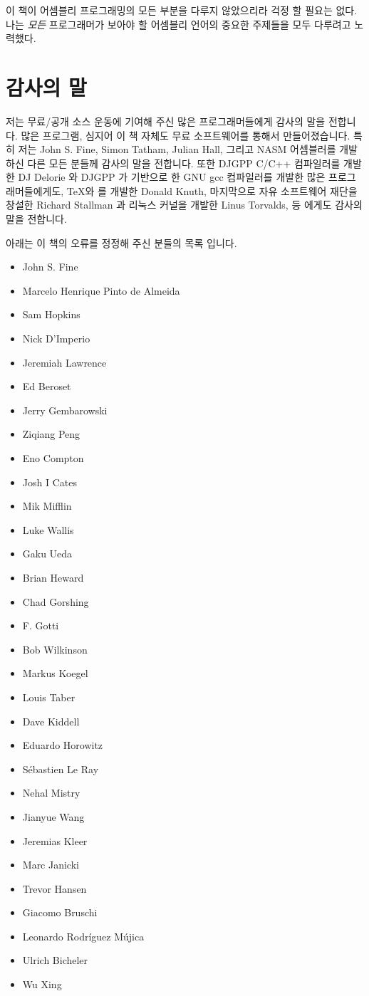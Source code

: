 이 책이 어셈블리 프로그래밍의 모든 부분을 다루지 않았으리라 걱정 할
필요는 없다. 나는 \emph{모든} 프로그래머가 보아야 할 어셈블리 언어의
중요한 주제들을 모두 다루려고 노력했다. 


\section*{감사의 말}

저는 무료/공개 소스 운동에 기여해 주신 많은 프로그래머들에게 감사의 말을 전합니다. 
많은 프로그램, 심지어 이 책 자체도 무료 소프트웨어를 통해서 만들어졌습니다. 특히 저는 
John S. Fine, Simon Tatham, Julian Hall, 그리고 NASM 어셈블러를 개발하신 다른 모든 분들께 
감사의 말을 전합니다. 또한 DJGPP C/C++ 컴파일러를 개발한 DJ Delorie 와 DJGPP 가 기반으로 
한 GNU gcc 컴파일러를 개발한 많은 프로그래머들에게도, \TeX 와 \LaTeXe 를 개발한 Donald Knuth,
마지막으로 자유 소프트웨어 재단을 창설한 Richard Stallman 과 리눅스 커널을 개발한 Linus Torvalds, 
등 에게도 감사의 말을 전합니다. 

아래는 이 책의 오류를 정정해 주신 분들의 목록 입니다. 
\begin{itemize}\setlength{\parskip}{-0.5em}
\item John S. Fine
\item Marcelo Henrique Pinto de Almeida
\item Sam Hopkins
\item Nick D'Imperio
\item Jeremiah Lawrence
\item Ed Beroset
\item Jerry Gembarowski
\item Ziqiang Peng
\item Eno Compton
\item Josh I Cates
\item Mik Mifflin
\item Luke Wallis
\item Gaku Ueda
\item Brian Heward
\item Chad Gorshing
\item F. Gotti
\item Bob Wilkinson
\item Markus Koegel
\item Louis Taber
\item Dave Kiddell
\item Eduardo Horowitz
\item S\'{e}bastien Le Ray
\item Nehal Mistry
\item Jianyue Wang
\item Jeremias Kleer
\item Marc Janicki
\item Trevor Hansen
\item Giacomo Bruschi
\item Leonardo Rodr\'{i}guez M\'{u}jica
\item Ulrich Bicheler
\item Wu Xing
\end{itemize}

